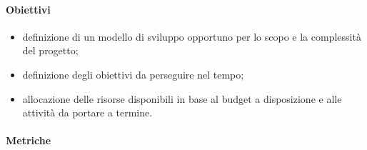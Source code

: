 \paragraph{Obiettivi}
\begin{itemize}
	\item definizione di un modello di sviluppo opportuno per lo scopo e la complessità del progetto;
	\item definizione degli obiettivi da perseguire nel tempo; 
	\item allocazione delle risorse disponibili in base al budget a disposizione e alle attività da portare a termine.
\end{itemize}
\paragraph{Metriche}
